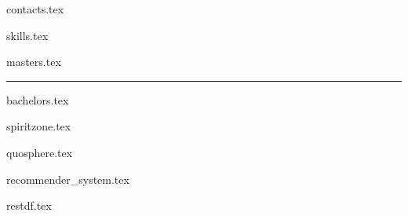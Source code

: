 \documentclass[11pt]{article}
\begin{document}
{contacts.tex}


{skills.tex}


{masters.tex}

\par\noindent\rule{\textwidth}{0.4pt}

{bachelors.tex}


{spiritzone.tex}

{quosphere.tex}


{recommender_system.tex}

{restdf.tex}
\end{document}
